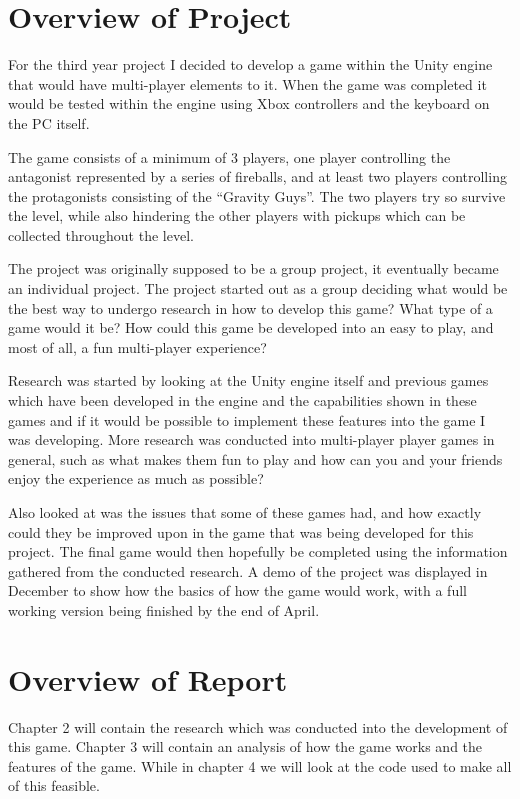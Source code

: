 \documentclass[10pt,a4paperpaper,openright]{book}
\begin{document}
\section{Overview of Project}\label{overview-of-project}

For the third year project I decided to develop a game within the Unity
engine that would have multi-player elements to it. When the game was
completed it would be tested within the engine using Xbox controllers
and the keyboard on the PC itself.

The game consists of a minimum of 3 players, one player controlling the
antagonist represented by a series of fireballs, and at least two
players controlling the protagonists consisting of the ``Gravity Guys''.
The two players try so survive the level, while also hindering the other
players with pickups which can be collected throughout the level.

The project was originally supposed to be a group project, it eventually
became an individual project. The project started out as a group
deciding what would be the best way to undergo research in how to
develop this game? What type of a game would it be? How could this game
be developed into an easy to play, and most of all, a fun multi-player
experience?

Research was started by looking at the Unity engine itself and previous
games which have been developed in the engine and the capabilities shown
in these games and if it would be possible to implement these features
into the game I was developing. More research was conducted into
multi-player player games in general, such as what makes them fun to
play and how can you and your friends enjoy the experience as much as
possible?

Also looked at was the issues that some of these games had, and how
exactly could they be improved upon in the game that was being developed
for this project. The final game would then hopefully be completed using
the information gathered from the conducted research. A demo of the
project was displayed in December to show how the basics of how the game
would work, with a full working version being finished by the end of
April.

\section{Overview of Report}\label{overview-of-report}

Chapter 2 will contain the research which was conducted into the
development of this game. Chapter 3 will contain an analysis of how the
game works and the features of the game. While in chapter 4 we will look
at the code used to make all of this feasible.
\end{document}
